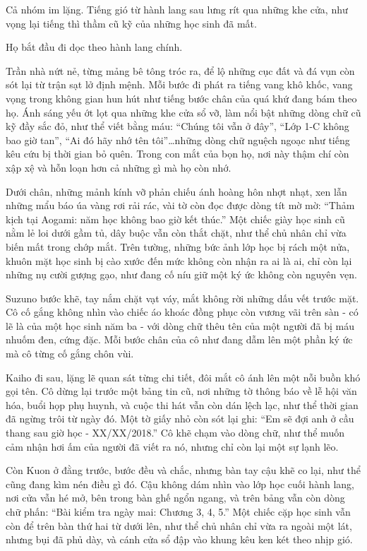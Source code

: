 \documentclass[../main.tex]{subfiles}
\begin{document}
Cả nhóm im lặng. Tiếng gió từ hành lang sau lưng rít qua những khe cửa, như vọng lại tiếng thì thầm cũ kỹ của những học sinh đã mất.

Họ bắt đầu đi dọc theo hành lang chính.


Trần nhà nứt nẻ, từng mảng bê tông tróc ra, để lộ những cục đất và đá vụn còn sót lại từ trận sạt lở định mệnh. Mỗi bước đi phát ra tiếng vang khô khốc, vang vọng trong không gian hun hút như tiếng bước chân của quá khứ đang bám theo họ. Ánh sáng yếu ớt lọt qua những khe cửa sổ vỡ, làm nổi bật những dòng chữ cũ kỹ đầy sắc đỏ, như thể viết bằng máu: ``Chúng tôi vẫn ở đây'', ``Lớp 1-C không bao giờ tan'', ``Ai đó hãy nhớ tên tôi''\dots những dòng chữ nguệch ngoạc như tiếng kêu cứu bị thời gian bỏ quên. Trong con mắt của bọn họ, nơi này thậm chí còn xập xệ và hỗn loạn hơn cả những gì mà họ còn nhớ.

Dưới chân, những mảnh kính vỡ phản chiếu ánh hoàng hôn nhợt nhạt, xen lẫn những mẩu báo úa vàng rơi rải rác, vài tờ còn đọc được dòng tít mờ mờ: ``Thảm kịch tại Aogami: năm học không bao giờ kết thúc.'' Một chiếc giày học sinh cũ nằm lẻ loi dưới gầm tủ, dây buộc vẫn còn thắt chặt, như thể chủ nhân chỉ vừa biến mất trong chớp mắt. Trên tường, những bức ảnh lớp học bị rách một nửa, khuôn mặt học sinh bị cào xước đến mức không còn nhận ra ai là ai, chỉ còn lại những nụ cười gượng gạo, như đang cố níu giữ một ký ức không còn nguyên vẹn.

Suzuno bước khẽ, tay nắm chặt vạt váy, mắt không rời những dấu vết trước mặt. Cô cố gắng không nhìn vào chiếc áo khoác đồng phục còn vương vãi trên sàn - có lẽ là của một học sinh năm ba - với dòng chữ thêu tên của một người đã bị máu nhuốm đen, cứng đặc. Mỗi bước chân của cô như đang dẫm lên một phần ký ức mà cô từng cố gắng chôn vùi.

Kaiho đi sau, lặng lẽ quan sát từng chi tiết, đôi mắt cô ánh lên một nỗi buồn khó gọi tên. Cô dừng lại trước một bảng tin cũ, nơi những tờ thông báo về lễ hội văn hóa, buổi họp phụ huynh, và cuộc thi hát vẫn còn dán lệch lạc, như thể thời gian đã ngừng trôi từ ngày đó. Một tờ giấy nhỏ còn sót lại ghi: ``Em sẽ đợi anh ở cầu thang sau giờ học - XX/XX/2018.'' Cô khẽ chạm vào dòng chữ, như thể muốn cảm nhận hơi ấm của người đã viết ra nó, nhưng chỉ còn lại một sự lạnh lẽo.

Còn Kuon ở đằng trước, bước đều và chắc, nhưng bàn tay cậu khẽ co lại, như thể cũng đang kìm nén điều gì đó. Cậu không dám nhìn vào lớp học cuối hành lang, nơi cửa vẫn hé mở, bên trong bàn ghế ngổn ngang, và trên bảng vẫn còn dòng chữ phấn: ``Bài kiểm tra ngày mai: Chương 3, 4, 5.'' Một chiếc cặp học sinh vẫn còn để trên bàn thứ hai từ dưới lên, như thể chủ nhân chỉ vừa ra ngoài một lát, nhưng bụi đã phủ dày, và cánh cửa sổ đập vào khung kêu ken két theo nhịp gió.
\end{document}
